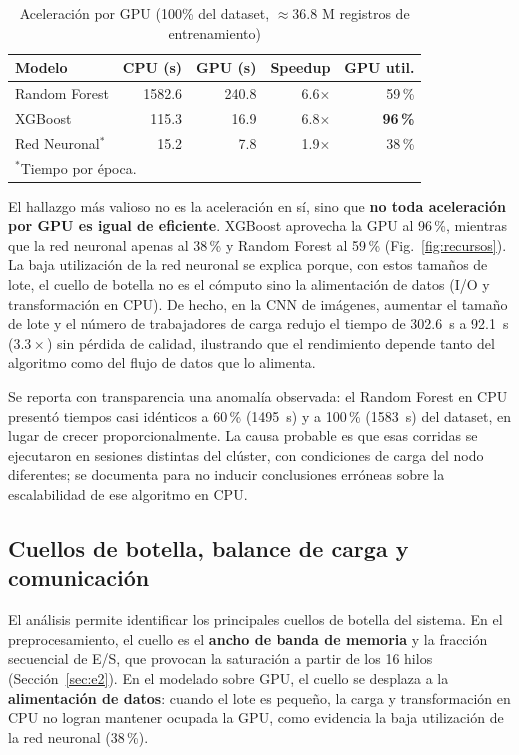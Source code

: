 \documentclass[conference]{IEEEtran}
\begin{document}
\begin{table}[tb]
\caption{Aceleración por GPU (100\% del dataset, $\approx$36.8 M registros de entrenamiento)}
\label{tab:gpu}
\centering
\renewcommand{\arraystretch}{1.2}
\begin{tabular}{l r r r r}
\toprule
\textbf{Modelo} & \textbf{CPU (s)} & \textbf{GPU (s)} & \textbf{Speedup} & \textbf{GPU util.} \\
\midrule
Random Forest & 1582.6 & 240.8 & 6.6$\times$ & 59\,\% \\
XGBoost & 115.3 & 16.9 & 6.8$\times$ & \textbf{96\,\%} \\
Red Neuronal$^{*}$ & 15.2 & 7.8 & 1.9$\times$ & 38\,\% \\
\bottomrule
\multicolumn{5}{l}{\scriptsize $^{*}$Tiempo por época.}
\end{tabular}
\end{table}

El hallazgo más valioso no es la aceleración en sí, sino que \textbf{no toda aceleración por GPU es igual de eficiente}. XGBoost aprovecha la GPU al 96\,\%, mientras que la red neuronal apenas al 38\,\% y Random Forest al 59\,\% (Fig.~\ref{fig:recursos}). La baja utilización de la red neuronal se explica porque, con estos tamaños de lote, el cuello de botella no es el cómputo sino la alimentación de datos (I/O y transformación en CPU). De hecho, en la CNN de imágenes, aumentar el tamaño de lote y el número de trabajadores de carga redujo el tiempo de 302.6~s a 92.1~s ($3.3\times$) sin pérdida de calidad, ilustrando que el rendimiento depende tanto del algoritmo como del flujo de datos que lo alimenta.

Se reporta con transparencia una anomalía observada: el Random Forest en CPU presentó tiempos casi idénticos a 60\,\% (1495~s) y a 100\,\% (1583~s) del dataset, en lugar de crecer proporcionalmente. La causa probable es que esas corridas se ejecutaron en sesiones distintas del clúster, con condiciones de carga del nodo diferentes; se documenta para no inducir conclusiones erróneas sobre la escalabilidad de ese algoritmo en CPU.

\subsection{Cuellos de botella, balance de carga y comunicación}
El análisis permite identificar los principales cuellos de botella del sistema. En el preprocesamiento, el cuello es el \textbf{ancho de banda de memoria} y la fracción secuencial de E/S, que provocan la saturación a partir de los 16 hilos (Sección~\ref{sec:e2}). En el modelado sobre GPU, el cuello se desplaza a la \textbf{alimentación de datos}: cuando el lote es pequeño, la carga y transformación en CPU no logran mantener ocupada la GPU, como evidencia la baja utilización de la red neuronal (38\,\%).
\end{document}
